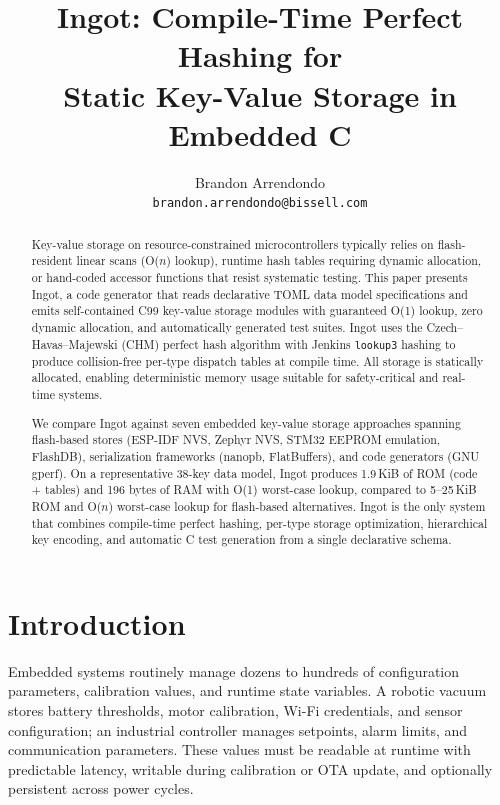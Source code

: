 \documentclass[10pt,twocolumn,letterpaper]{article}
\begin{document}
\title{Ingot: Compile-Time Perfect Hashing for\\Static Key-Value Storage in Embedded C}

\author{Brandon Arrendondo\\
{\tt\small brandon.arrendondo@bissell.com}
}
\maketitle

\begin{abstract}
Key-value storage on resource-constrained microcontrollers typically
relies on flash-resident linear scans (O($n$) lookup), runtime hash
tables requiring dynamic allocation, or hand-coded accessor functions
that resist systematic testing.  This paper presents Ingot, a code
generator that reads declarative TOML data model specifications and
emits self-contained C99 key-value storage modules with guaranteed
O(1) lookup, zero dynamic allocation, and automatically generated
test suites.  Ingot uses the Czech--Havas--Majewski (CHM) perfect hash
algorithm with Jenkins \texttt{lookup3} hashing to produce
collision-free per-type dispatch tables at compile time.  All storage
is statically allocated, enabling deterministic memory usage suitable
for safety-critical and real-time systems.

We compare Ingot against seven embedded key-value storage approaches
spanning flash-based stores (ESP-IDF NVS, Zephyr NVS, STM32 EEPROM
emulation, FlashDB), serialization frameworks (nanopb, FlatBuffers),
and code generators (GNU gperf).  On a representative 38-key data
model, Ingot produces 1.9\,KiB of ROM (code + tables) and 196 bytes of
RAM with O(1) worst-case lookup, compared to 5--25\,KiB ROM and
O($n$) worst-case lookup for flash-based alternatives.  Ingot is the
only system that combines compile-time perfect hashing, per-type
storage optimization, hierarchical key encoding, and automatic C test
generation from a single declarative schema.
\end{abstract}

\section{Introduction}
\label{sec:intro}

Embedded systems routinely manage dozens to hundreds of configuration
parameters, calibration values, and runtime state variables.  A
robotic vacuum stores battery thresholds, motor calibration, Wi-Fi
credentials, and sensor configuration; an industrial controller
manages setpoints, alarm limits, and communication parameters.  These
values must be readable at runtime with predictable latency, writable
during calibration or OTA update, and optionally persistent across
power cycles.
\end{document}
